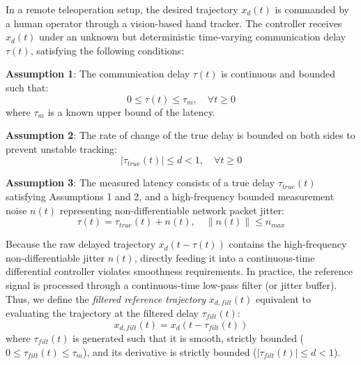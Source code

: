 \documentclass[letterpaper,journal]{IEEEtran}
\begin{document}
In a remote teleoperation setup, the desired trajectory $x_d(t)$ is commanded by a human operator through a vision-based hand tracker. The controller receives $x_d(t)$ under an unknown but deterministic time-varying communication delay $\tau(t)$, satisfying the following conditions:

\textbf{Assumption 1}: The communication delay $\tau(t)$ is continuous and bounded such that:
\begin{equation}
0 \le \tau(t) \le \tau_m, \quad \forall t \ge 0
\end{equation}
where $\tau_m$ is a known upper bound of the latency.

\textbf{Assumption 2}: The rate of change of the true delay is bounded on both sides to prevent unstable tracking:
\begin{equation}
|\dot{\tau}_{true}(t)| \le d < 1, \quad \forall t \ge 0
\end{equation}

\textbf{Assumption 3}: The measured latency consists of a true delay $\tau_{true}(t)$ satisfying Assumptions 1 and 2, and a high-frequency bounded measurement noise $n(t)$ representing non-differentiable network packet jitter:
\begin{equation}
\tau(t) = \tau_{true}(t) + n(t), \quad \|n(t)\| \le n_{max}
\end{equation}

Because the raw delayed trajectory $x_d(t - \tau(t))$ contains the high-frequency non-differentiable jitter $n(t)$, directly feeding it into a continuous-time differential controller violates smoothness requirements. In practice, the reference signal is processed through a continuous-time low-pass filter (or jitter buffer). Thus, we define the \textit{filtered reference trajectory} $x_{d,filt}(t)$ equivalent to evaluating the trajectory at the filtered delay $\tau_{filt}(t)$:
\begin{equation}
x_{d,filt}(t) = x_d(t - \tau_{filt}(t))
\end{equation}
where $\tau_{filt}(t)$ is generated such that it is smooth, strictly bounded ($0 \le \tau_{filt}(t) \le \tau_m$), and its derivative is strictly bounded ($|\dot{\tau}_{filt}(t)| \le d < 1$).
\end{document}
